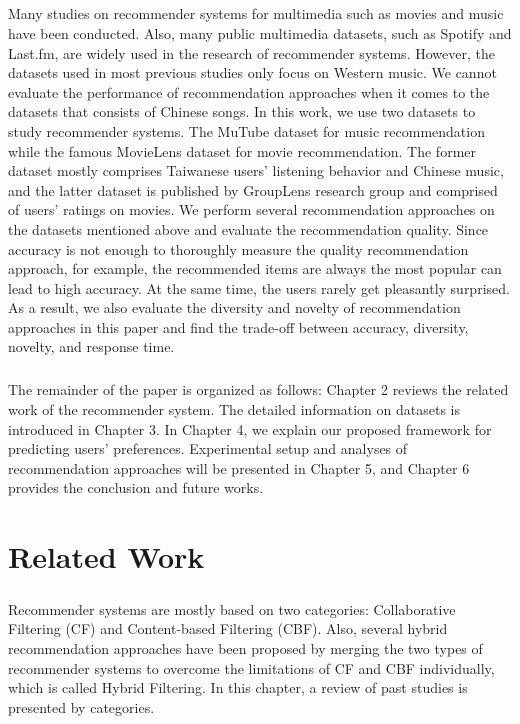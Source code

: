 \documentclass[a4paper,12pt]{report}
\begin{document}
\paragraph{}
Many studies on recommender systems for multimedia such as movies and music have been conducted. Also, many public multimedia datasets, such as Spotify\cite{spotify2018} and Last.fm\cite{vigliensoni17music,Bertin-Mahieux2011}, are widely used in the research of recommender systems. However, the datasets used in most previous studies only focus on Western music. We cannot evaluate the performance of recommendation approaches when it comes to the datasets that consists of Chinese songs. In this work, we use two datasets to study recommender systems. The MuTube\cite{MuTube2020ICS} dataset for music recommendation while the famous MovieLens\cite{harper2015movielens} dataset for movie recommendation. The former dataset mostly comprises Taiwanese users' listening behavior and Chinese music, and the latter dataset is published by GroupLens research group and comprised of users' ratings on movies. We perform several recommendation approaches on the datasets mentioned above and evaluate the recommendation quality. Since accuracy is not enough to thoroughly measure the quality recommendation approach, for example, the recommended items are always the most popular can lead to high accuracy. At the same time, the users rarely get pleasantly surprised. As a result, we also evaluate the diversity and novelty of recommendation approaches in this paper and find the trade-off between accuracy, diversity, novelty, and response time.
\paragraph{}
The remainder of the paper is organized as follows: Chapter 2 reviews the related work of the recommender system. The detailed information on datasets is introduced in Chapter 3. In Chapter 4, we explain our proposed framework for predicting users' preferences. Experimental setup and analyses of recommendation approaches will be presented in Chapter 5, and Chapter 6 provides the conclusion and future works.

\chapter{Related Work}
\paragraph{}
Recommender systems are mostly based on two categories: Collaborative Filtering (CF) and Content-based Filtering (CBF). Also, several hybrid recommendation approaches have been proposed by merging the two types of recommender systems to overcome the limitations of CF and CBF individually, which is called Hybrid Filtering. In this chapter, a review of past studies is presented by categories.
\end{document}
